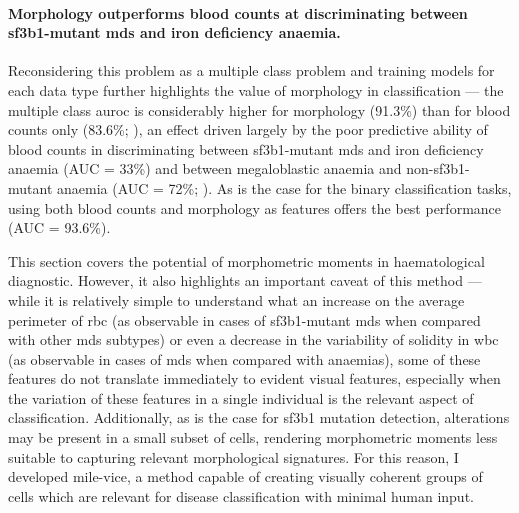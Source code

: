 \paragraph{Morphology outperforms blood counts at discriminating between \ac{sf3b1}-mutant \ac{mds} and iron deficiency anaemia.} Reconsidering this problem as a multiple class problem and training models for each data type further highlights the value of morphology in classification --- the multiple class \ac{auroc} is considerably higher for morphology (91.3\%) than for blood counts only (83.6\%; ), an effect driven largely by the poor predictive ability of blood counts in discriminating between \ac{sf3b1}-mutant \ac{mds} and iron deficiency anaemia (AUC = 33\%) and between megaloblastic anaemia and non-\ac{sf3b1}-mutant anaemia (AUC = 72\%; ). As is the case for the binary classification tasks, using both blood counts and morphology as features offers the best performance (AUC = 93.6\%).

\begin{figure}[!ht]
    \label{fig:multiclass-auc}
\end{figure}

\begin{figure}[!ht]
    \label{fig:multiclass-auc-heatmap}
\end{figure}

This section covers the potential of morphometric moments in haematological diagnostic. However, it also highlights an important caveat of this method --- while it is relatively simple to understand what an increase on the average perimeter of \ac{rbc} (as observable in cases of \ac{sf3b1}-mutant \ac{mds} when compared with other \ac{mds} subtypes) or even a decrease in the variability of solidity in \ac{wbc} (as observable in cases of \ac{mds} when compared with anaemias), some of these features do not translate immediately to evident visual features, especially when the variation of these features in a single individual is the relevant aspect of classification. Additionally, as is the case for \ac{sf3b1} mutation detection, alterations may be present in a small subset of cells, rendering morphometric moments less suitable to capturing relevant morphological signatures. For this reason, I developed \ac{mile-vice}, a method capable of creating visually coherent groups of cells which are relevant for disease classification with minimal human input.

